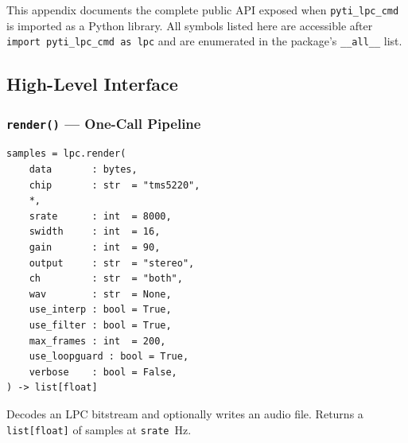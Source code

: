 \documentclass[10pt]{article}
\begin{document}
This appendix documents the complete public API exposed when
\texttt{pyti\_lpc\_cmd} is imported as a Python library.  All symbols listed
here are accessible after \lstinline{import pyti_lpc_cmd as lpc} and are
enumerated in the package's \texttt{\_\_all\_\_} list.

\subsection{High-Level Interface}

\subsubsection{\texttt{render()} — One-Call Pipeline}

\begin{lstlisting}[caption={render() function signature}]
samples = lpc.render(
    data       : bytes,
    chip       : str  = "tms5220",
    *,
    srate      : int  = 8000,
    swidth     : int  = 16,
    gain       : int  = 90,
    output     : str  = "stereo",
    ch         : str  = "both",
    wav        : str  = None,
    use_interp : bool = True,
    use_filter : bool = True,
    max_frames : int  = 200,
    use_loopguard : bool = True,
    verbose    : bool = False,
) -> list[float]
\end{lstlisting}

\noindent Decodes an LPC bitstream and optionally writes an audio file.
Returns a \texttt{list[float]} of samples at \texttt{srate}~Hz.
\end{document}
